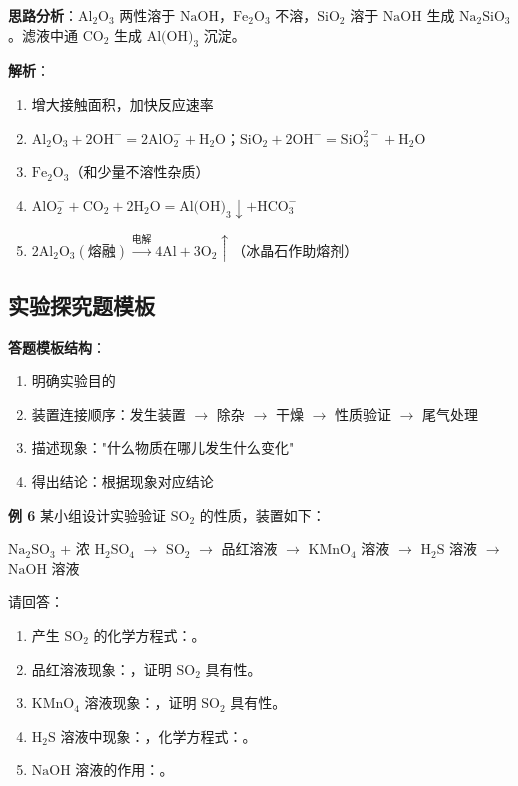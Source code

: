 \textbf{思路分析}：$\text{Al}_2\text{O}_3$ 两性溶于 $\text{NaOH}$，$\text{Fe}_2\text{O}_3$ 不溶，$\text{SiO}_2$ 溶于 $\text{NaOH}$ 生成 $\text{Na}_2\text{SiO}_3$。滤液中通 $\text{CO}_2$ 生成 $\text{Al(OH)}_3$ 沉淀。

\textbf{解析}：
\begin{enumerate}
  \item 增大接触面积，加快反应速率
  \item $\text{Al}_2\text{O}_3 + 2\text{OH}^- = 2\text{AlO}_2^- + \text{H}_2\text{O}$；$\text{SiO}_2 + 2\text{OH}^- = \text{SiO}_3^{2-} + \text{H}_2\text{O}$
  \item $\text{Fe}_2\text{O}_3$（和少量不溶性杂质）
  \item $\text{AlO}_2^- + \text{CO}_2 + 2\text{H}_2\text{O} = \text{Al(OH)}_3\downarrow + \text{HCO}_3^-$
  \item $2\text{Al}_2\text{O}_3(\text{熔融}) \xrightarrow{\text{电解}} 4\text{Al} + 3\text{O}_2\uparrow$（冰晶石作助熔剂）
\end{enumerate}

\subsection{实验探究题模板}

\textbf{答题模板结构}：
\begin{enumerate}
  \item 明确实验目的
  \item 装置连接顺序：发生装置 $\to$ 除杂 $\to$ 干燥 $\to$ 性质验证 $\to$ 尾气处理
  \item 描述现象："什么物质在哪儿发生什么变化"
  \item 得出结论：根据现象对应结论
\end{enumerate}

\textbf{例 6} 某小组设计实验验证 $\text{SO}_2$ 的性质，装置如下：

$\text{Na}_2\text{SO}_3$ + 浓 $\text{H}_2\text{SO}_4$ $\to$ $\text{SO}_2$ $\to$ 品红溶液 $\to$ $\text{KMnO}_4$ 溶液 $\to$ $\text{H}_2\text{S}$ 溶液 $\to$ $\text{NaOH}$ 溶液

请回答：
\begin{enumerate}
  \item 产生 $\text{SO}_2$ 的化学方程式：\underline{\qquad\qquad}。
  \item 品红溶液现象：\underline{\qquad\qquad}，证明 $\text{SO}_2$ 具有\underline{\qquad\qquad}性。
  \item $\text{KMnO}_4$ 溶液现象：\underline{\qquad\qquad}，证明 $\text{SO}_2$ 具有\underline{\qquad\qquad}性。
  \item $\text{H}_2\text{S}$ 溶液中现象：\underline{\qquad\qquad}，化学方程式：\underline{\qquad\qquad}。
  \item $\text{NaOH}$ 溶液的作用：\underline{\qquad\qquad}。
\end{enumerate}

